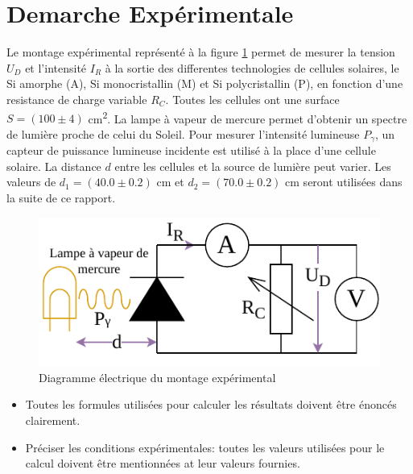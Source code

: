 \section{Demarche Expérimentale}

Le montage expérimental représenté à la figure \ref{fig:montage} permet de mesurer la tension \(U_D\) et l'intensité \(I_R\) à la sortie des differentes technologies de cellules solaires, le Si amorphe (A), Si monocristallin (M) et Si polycristallin (P), en fonction d'une resistance de charge variable \(R_C\).
Toutes les cellules ont une surface \(S = (100 \pm 4)\) \unit{\centi\meter^2}. La lampe à vapeur de mercure permet d'obtenir un spectre de lumière proche de celui du Soleil.
Pour mesurer l'intensité lumineuse \(P_\gamma\), un capteur de puissance lumineuse incidente est utilisé à la place d'une cellule solaire.
La distance \(d\) entre les cellules et la source de lumière peut varier. Les valeurs de \(d_1 = (40.0 \pm 0.2)\) \unit{\centi\meter} et \(d_2 = (70.0 \pm 0.2)\) \unit{\centi\meter} seront utilisées dans la suite de ce rapport.

\begin{figure}
    \centering
    \includegraphics[width=12cm]{figures/montage.pdf}
    \caption{Diagramme électrique du montage expérimental \cite{notice} \cite{nicole}}
    \label{fig:montage}
\end{figure}

\begin{itemize}
\item Toutes les formules utilisées pour calculer les résultats doivent être énoncés clairement.
\item Préciser les conditions expérimentales: toutes les valeurs utilisées pour le calcul doivent être mentionnées at leur valeurs fournies.
\end{itemize}
